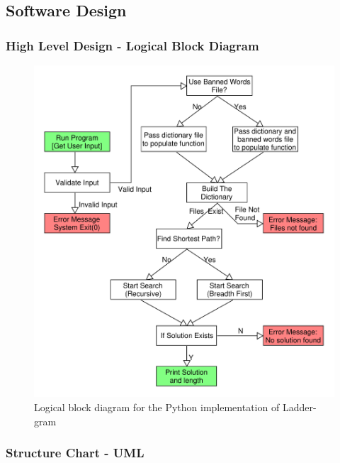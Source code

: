 \documentclass[12pt, a4]{report}
\begin{document}
\subsection{Software Design}
	\subsubsection{High Level Design - Logical Block Diagram}

	\begin{figure}[!h]
	\centering
	\includegraphics[scale=0.6]{Logical_Block_Laddergram}
	\caption{Logical block diagram for the Python implementation of Ladder-gram}
	\end{figure}
				
	\pagebreak

	\subsubsection{Structure Chart - UML}
	\paragraph{}
\end{document}
